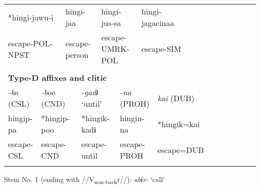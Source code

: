 \begin{tabularx}{\textwidth}{XXXXXXXXXXXXXXXXXXXXXXX}
\multicolumn{4}{X}{{ *hingi-jawu-i}} & \multicolumn{3}{X}{{ hingi-jaa}} & \multicolumn{4}{X}{{ hingi-jus-sa}} & \multicolumn{5}{X}{{ hingi-jagacinaa}} & \multicolumn{7}{X}{}\\
\multicolumn{4}{X}{escape-POL-NPST} & \multicolumn{3}{X}{escape-person} & \multicolumn{4}{X}{escape-UMRK-POL} & \multicolumn{5}{X}{escape-SIM} & \multicolumn{7}{X}{}\\
\multicolumn{23}{X}{}\\
\multicolumn{23}{X}{{\bfseries Type-D affixes and clitic}}\\
\multicolumn{2}{X}{{ \textit{{}-ba} (CSL)}} & \multicolumn{3}{X}{{ \textit{{}-boo} (CND)}} & \multicolumn{4}{X}{{ \textit{{}-gadɨ} ‘until’}} & \multicolumn{4}{X}{{ \textit{{}-na} (PROH)}} & \multicolumn{4}{X}{{ \textit{kai} (DUB)}} & \multicolumn{6}{X}{}\\
\multicolumn{2}{X}{{ hingip-pa}} & \multicolumn{3}{X}{{ *hingip-poo}} & \multicolumn{4}{X}{{ *hingik-kadɨ}} & \multicolumn{4}{X}{{ hingin-na}} & \multicolumn{4}{X}{{ *hingik=kai}} & \multicolumn{6}{X}{}\\
\multicolumn{2}{X}{escape-CSL} & \multicolumn{3}{X}{escape-CND} & \multicolumn{4}{X}{escape-until} & \multicolumn{4}{X}{escape-PROH} & \multicolumn{4}{X}{escape=DUB} & \multicolumn{6}{X}{}\\
\lspbottomrule
\end{tabularx}

Stem No. 1 (ending with //V\textsubscript{non-back}r//): \textit{abɨr-} ‘call’

\tablefirsthead{}

